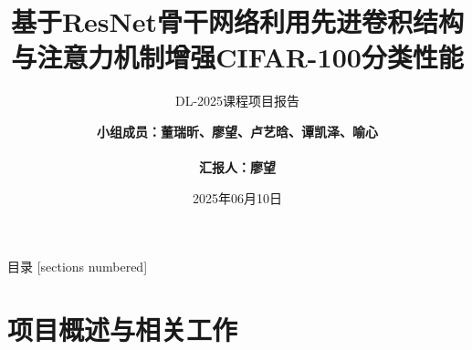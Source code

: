\documentclass[10pt]{beamer}
\title{\bfseries 基于ResNet骨干网络利用先进卷积结构与注意力机制增强CIFAR-100分类性能}
\subtitle{DL-2025课程项目报告}
\date{2025年06月10日}
\author{\bf
小组成员：董瑞昕、廖望、卢艺晗、谭凯泽、喻心 \\\\ 汇报人：廖望
}
\institute{南开大学计算机学院}
\begin{document}
\maketitle

\begin{frame}{目录}
\hypersetup{linkcolor=black}
[sections numbered]
\tableofcontents
\end{frame}


\section{项目概述与相关工作}
\end{document}
